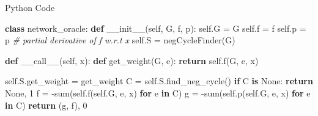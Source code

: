 \documentclass[10pt,ignorenonframetext,serif,onlymath]{beamer}
\newenvironment{Shaded}{}{}
\newcommand{\BuiltInTok}[1]{#1}
\newcommand{\CommentTok}[1]{\textcolor[rgb]{0.38,0.63,0.69}{\textit{#1}}}
\newcommand{\ControlFlowTok}[1]{\textcolor[rgb]{0.00,0.44,0.13}{\textbf{#1}}}
\newcommand{\DecValTok}[1]{\textcolor[rgb]{0.25,0.63,0.44}{#1}}
\newcommand{\FunctionTok}[1]{\textcolor[rgb]{0.02,0.16,0.49}{#1}}
\newcommand{\KeywordTok}[1]{\textcolor[rgb]{0.00,0.44,0.13}{\textbf{#1}}}
\newcommand{\NormalTok}[1]{#1}
\newcommand{\OperatorTok}[1]{\textcolor[rgb]{0.40,0.40,0.40}{#1}}
\newcommand{\VariableTok}[1]{\textcolor[rgb]{0.10,0.09,0.49}{#1}}
\begin{document}
\begin{frame}[fragile]{Python Code}
\protect\hypertarget{python-code}{}

\scriptsize

\begin{Shaded}
\begin{Highlighting}[]
\KeywordTok{class}\NormalTok{ network_oracle:}
    \KeywordTok{def} \FunctionTok{__init__}\NormalTok{(}\VariableTok{self}\NormalTok{, G, f, p):}
        \VariableTok{self}\NormalTok{.G }\OperatorTok{=}\NormalTok{ G}
        \VariableTok{self}\NormalTok{.f }\OperatorTok{=}\NormalTok{ f}
        \VariableTok{self}\NormalTok{.p }\OperatorTok{=}\NormalTok{ p  }\CommentTok{# partial derivative of f w.r.t x}
        \VariableTok{self}\NormalTok{.S }\OperatorTok{=}\NormalTok{ negCycleFinder(G)}

    \KeywordTok{def} \FunctionTok{__call__}\NormalTok{(}\VariableTok{self}\NormalTok{, x):}
        \KeywordTok{def}\NormalTok{ get_weight(G, e):}
            \ControlFlowTok{return} \VariableTok{self}\NormalTok{.f(G, e, x)}

        \VariableTok{self}\NormalTok{.S.get_weight }\OperatorTok{=}\NormalTok{ get_weight}
\NormalTok{        C }\OperatorTok{=} \VariableTok{self}\NormalTok{.S.find_neg_cycle()}
        \ControlFlowTok{if}\NormalTok{ C }\KeywordTok{is} \VariableTok{None}\NormalTok{:}
            \ControlFlowTok{return} \VariableTok{None}\NormalTok{, }\DecValTok{1}
\NormalTok{        f }\OperatorTok{=} \OperatorTok{-}\BuiltInTok{sum}\NormalTok{(}\VariableTok{self}\NormalTok{.f(}\VariableTok{self}\NormalTok{.G, e, x) }\ControlFlowTok{for}\NormalTok{ e }\KeywordTok{in}\NormalTok{ C)}
\NormalTok{        g }\OperatorTok{=} \OperatorTok{-}\BuiltInTok{sum}\NormalTok{(}\VariableTok{self}\NormalTok{.p(}\VariableTok{self}\NormalTok{.G, e, x) }\ControlFlowTok{for}\NormalTok{ e }\KeywordTok{in}\NormalTok{ C)}
        \ControlFlowTok{return}\NormalTok{ (g, f), }\DecValTok{0}
\end{Highlighting}
\end{Shaded}

\end{frame}
\end{document}
